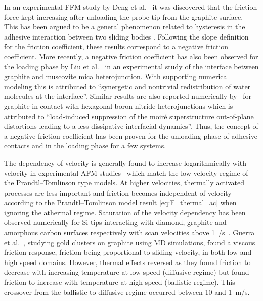 In an experimental \acrshort{FFM} study by Deng et al.~\cite{deng_adhesion-dependent_2012} it was discovered that
the friction force kept increasing after unloading the probe tip from the
graphite surface. This has been argued to be a general phenomenon
related to hysteresis in the adhesive interaction between two sliding bodies
\cite{thormann_negative_2013}. Following the slope definition for the friction
coefficient, these results correspond to a negative friction coefficient. More recently, a negative friction coefficient has also been observed for the loading phase by Liu et al.~\cite{Liu_2020} in an experimental study of the interface between graphite and muscovite mica heterojunction. With supporting numerical modeling this is attributed to ``synergetic and nontrivial redistribution of water molecules at the interface''. Similar results are also reported numerically by~\cite{Mandelli_2019} for graphite in contact with hexagonal boron nitride heterojunctions which is attributed to ``load-induced suppression of the moiré superstructure out-of-plane distortions leading to a less dissipative interfacial dynamics''. Thus, the concept of a negative friction coefficient has been proven for the unloading phase of adhesive contacts and in the loading phase for a few systems. 

The dependency of velocity is generally found to increase logarithmically with
velocity in experimental \acrshort{AFM} studies~\cite[p. 201]{gnecco_meyer_2015}
which match the low-velocity regime of the Prandtl–Tomlinson type models. At higher
velocities, thermally activated processes are less important and friction becomes
independent of velocity according to the Prandtl–Tomlinson model result \cref{eq:F_thermal_ac} when ignoring the athermal regime. Saturation of the velocity dependency has been observed numerically for Si tips interacting with diamond, graphite and amorphous carbon surfaces respectively with scan velocities above \SI{1}{\mu/s}~\cite{zworner1998velocity}. Guerra et al.~\cite{Guerra_2010}, studying gold clusters on graphite using \acrshort{MD} simulations, found a viscous friction response, friction being proportional to sliding velocity, in both low and high speed domains. However, thermal effects reversed as they found friction to decrease with increasing temperature at low speed (diffusive regime) but found friction to increase with temperature at high speed (ballistic regime). This crossover from the ballistic to diffusive regime occurred between 10 and \SI{1}{m/s}. 



